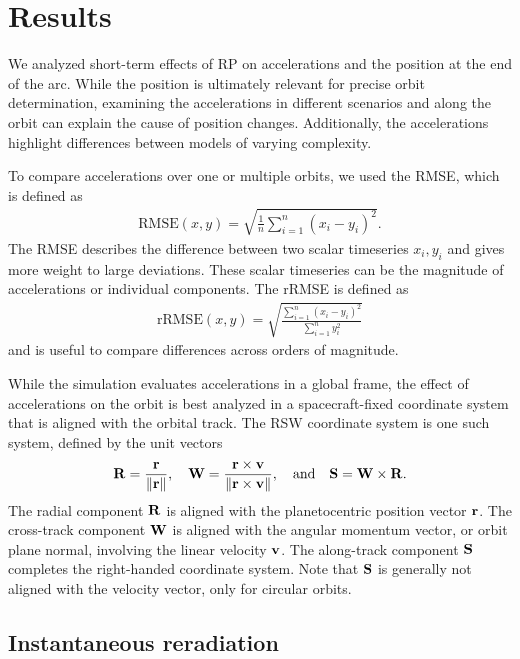 \section{Results}
We analyzed short-term effects of \gls{RP} on accelerations and the position at the end of the arc. While the position is ultimately relevant for precise orbit determination, examining the accelerations in different scenarios and along the orbit can explain the cause of position changes. Additionally, the accelerations highlight differences between models of varying complexity.

To compare accelerations over one or multiple orbits, we used the \gls{RMSE}, which is defined as
\begin{align}
    \text{RMSE}(x, y) = \sqrt{\frac{1}{n}\sum_{i=1}^{n}\left(x_i - y_i\right)^2}.
\end{align}
The \gls{RMSE} describes the difference between two scalar timeseries $x_i, y_i$ and gives more weight to large deviations. These scalar timeseries can be the magnitude of accelerations or individual components. The \gls{rRMSE} is defined as
\begin{align}
    \text{rRMSE}(x, y) = \sqrt{\frac{\sum_{i=1}^{n}\left(x_i - y_i\right)^2}{\sum_{i=1}^{n} y_i^2}}
\end{align}
and is useful to compare differences across orders of magnitude.

While the simulation evaluates accelerations in a global frame, the effect of accelerations on the orbit is best analyzed in a spacecraft-fixed coordinate system that is aligned with the orbital track. The RSW coordinate system is one such system, defined by the unit vectors~\cite{Vallado2013}
\begin{align}
    \vb R = \frac{\vb r}{\norm{\vb r}}, \quad
    \vb W = \frac{\vb r \times \vb v}{\norm{\vb r \times \vb v}},
    \quad \textrm{and} \quad \vb S = \vb W \times \vb R.
\end{align}
The radial component $\vb R$ is aligned with the planetocentric position vector $\vb r$. The cross-track component $\vb W$ is aligned with the angular momentum vector, or orbit plane normal, involving the linear velocity $\vb v$. The along-track component $\vb S$ completes the right-handed coordinate system. Note that $\vb S$ is generally not aligned with the velocity vector, only for circular orbits.





\subsection{Instantaneous reradiation}
\label{subsec:inst-rerad}

